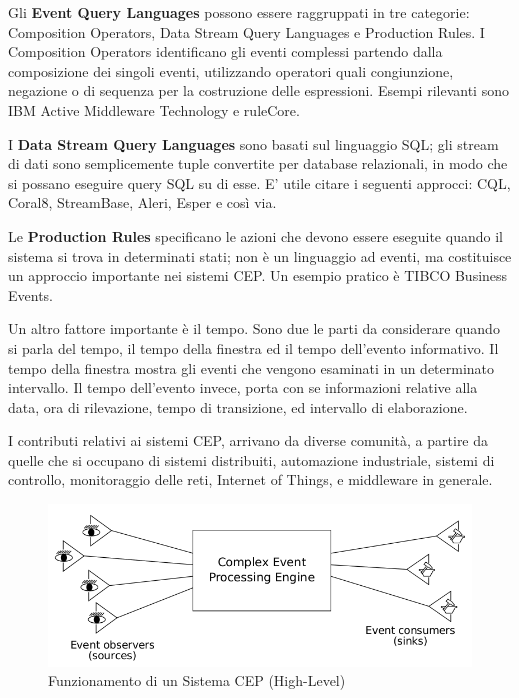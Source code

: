 \documentclass[11pt]{article}
\begin{document}
Gli \textbf{Event Query Languages} possono essere raggruppati in tre categorie: Composition Operators, Data Stream Query Languages e
Production Rules. I Composition Operators identificano gli eventi complessi partendo dalla composizione dei singoli eventi, utilizzando operatori quali congiunzione, negazione o di sequenza per la costruzione delle espressioni. Esempi rilevanti sono IBM Active Middleware Technology e ruleCore. 

I \textbf{Data Stream Query Languages} sono basati sul linguaggio SQL; gli stream di dati sono semplicemente tuple convertite per database relazionali, in modo che si possano eseguire query SQL su di esse. E' utile citare i seguenti approcci: CQL, Coral8, StreamBase,
Aleri, Esper e così via.

Le \textbf{Production Rules} specificano le azioni che devono essere eseguite quando il sistema si trova in determinati stati; non è un linguaggio ad eventi, ma costituisce un approccio importante nei sistemi CEP. Un esempio pratico è TIBCO Business Events.

Un altro fattore importante è il tempo. Sono due le parti da considerare quando si parla del tempo, il tempo della finestra ed il tempo dell'evento informativo. Il tempo della finestra mostra gli eventi che vengono esaminati in un determinato intervallo. Il tempo dell'evento invece, porta con se informazioni relative alla data, ora di rilevazione, tempo di transizione, ed intervallo di elaborazione.

I contributi relativi ai sistemi CEP, arrivano da diverse comunità, a partire da quelle che si occupano di sistemi distribuiti, automazione industriale, sistemi di controllo, monitoraggio delle reti, Internet of Things, e middleware in generale.

\begin{figure}[H]
	\centering
	\includegraphics[scale=0.40]{images/CEP.png}
	\caption{Funzionamento di un Sistema CEP (High-Level) \cite{Cugola:2012:PFI:2187671.2187677}}
	\label{funcep}
\end{figure}
\end{document}
